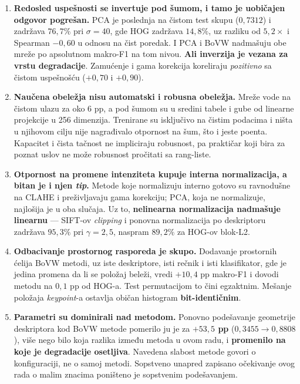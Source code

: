 \documentclass[11pt,a4paper]{article}
\begin{document}
\begin{enumerate}
\item \textbf{Redosled uspešnosti se invertuje pod šumom, i tamo je uobičajen odgovor pogrešan.}
PCA je poslednja na čistom test skupu ($0{,}7312$) i zadržava $76{,}7\%$ pri $\sigma=40$, gde HOG
zadržava $14{,}8\%$, uz razliku od $5{,}2\times$ i Spearman $-0{,}60$ u odnosu na čist poredak. I
PCA i BoVW nadmašuju obe mreže po apsolutnom makro-F1 na tom nivou. \textbf{Ali inverzija je
vezana za vrstu degradacije}. Zamućenje i gama korekcija koreliraju \emph{pozitivno} sa čistom
uspešnošću ($+0{,}70$ i $+0{,}90$).

\item \textbf{Naučena obeležja nisu automatski i robusna obeležja.} Mreže vode na čistom ulazu
za oko 6 pp, a pod šumom su u sredini tabele i gube od linearne projekcije u 256 dimenzija.
Trenirane su isključivo na čistim podacima i ništa u njihovom cilju nije nagrađivalo otpornost
na šum, što i jeste poenta. Kapacitet i čista tačnost ne impliciraju robusnost, pa praktičar
koji bira za poznat uslov ne može robusnost pročitati sa rang-liste.

\item \textbf{Otpornost na promene intenziteta kupuje interna normalizacija, a bitan je i njen \emph{tip}.} Metode koje normalizuju interno gotovo su ravnodušne na CLAHE i preživljavaju gama
korekciju; PCA, koja ne normalizuje, najlošija je u oba slučaja. Uz to, \textbf{nelinearna
normalizacija nadmašuje linearnu} — SIFT-ov \textit{clipping} i ponovna normalizacija po deskriptoru
zadržava $95{,}3\%$ pri $\gamma=2{,}5$, naspram $89{,}2\%$ za HOG-ov blok-L2.

\item \textbf{Odbacivanje prostornog rasporeda je skupo.}
Dodavanje prostornih ćelija BoVW metodi, uz iste deskriptore, isti rečnik i isti klasifikator,
gde je jedina promena da li se položaj beleži, vredi $+10{,}4$ pp makro-F1 i dovodi metodu na
$0{,}1$ pp od HOG-a. Test permutacijom to čini egzaktnim. Mešanje položaja \textit{keypoint}-a
ostavlja običan histogram \textbf{bit-identičnim}.

\item \textbf{Parametri su dominirali nad metodom.} Ponovno podešavanje geometrije deskriptora
kod BoVW metode pomerilo ju je za \textbf{$+53{,}5$ pp} ($0{,}3455 \to 0{,}8808$), više nego bilo
koja razlika između metoda u ovom radu, i \textbf{promenilo na koje je degradacije osetljiva}.
Navedena slabost metode govori o konfiguraciji, ne o samoj metodi. Sopstveno unapred
zapisano očekivanje ovog rada o malim znacima poništeno je sopstvenim podešavanjem.
\end{enumerate}
\end{document}
